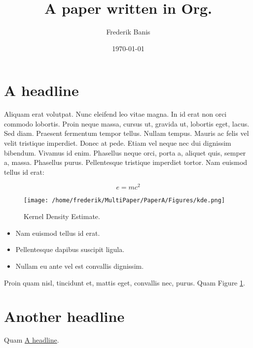 \documentclass[11pt]{IEEEtran}
\author{Frederik Banis}
\date{\today}
\title{A paper written in Org.}
\begin{document}
\maketitle
\tableofcontents

\section{A headline}
\label{sec:org682fb97}
Aliquam erat volutpat.  Nunc eleifend leo vitae magna.  In id erat non orci commodo lobortis.  Proin neque massa, cursus ut, gravida ut, lobortis eget, lacus.  Sed diam.  Praesent fermentum tempor tellus.  Nullam tempus.  Mauris ac felis vel velit tristique imperdiet.  Donec at pede.  Etiam vel neque nec dui dignissim bibendum.  Vivamus id enim.  Phasellus neque orci, porta a, aliquet quis, semper a, massa.  Phasellus purus.  Pellentesque tristique imperdiet tortor.  Nam euismod tellus id erat:

\begin{equation}
\label{eq:1}
e = m c^2
\end{equation}

\begin{figure}[htbp]
\centering
\texttt{[image: /home/frederik/MultiPaper/PaperA/Figures/kde.png]}
\caption{\label{fig_kde}
Kernel Density Estimate.}
\end{figure}

\begin{itemize}
\item Nam euismod tellus id erat.
\item Pellentesque dapibus suscipit ligula.
\item Nullam eu ante vel est convallis dignissim.
\end{itemize}

Proin quam nisl, tincidunt et, mattis eget, convallis nec, purus. Quam Figure \ref{fig_kde}.
\section{Another headline}
\label{sec:org738ae78}

Quam \hyperref[sec:org682fb97]{A headline}.
\end{document}
